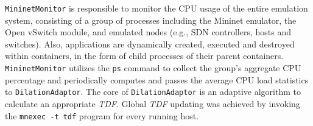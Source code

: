 \texttt{MininetMonitor} is responsible to monitor the CPU usage of the entire emulation system,
consisting of a group of processes including the Mininet emulator, the Open vSwitch module, and emulated nodes (e.g., SDN controllers, hosts and switches). 
Also, applications are dynamically created, executed and destroyed within containers, in the form of child processes of their parent containers. 
\texttt{MininetMonitor} utilizes the \texttt{ps} command to collect the group's aggregate CPU percentage
and periodically computes and passes the average CPU load statistics to \texttt{DilationAdaptor}. 
The core of \texttt{DilationAdaptor} is an adaptive algorithm to calculate an appropriate \textit{TDF}.
Global \textit{TDF} updating was achieved by invoking the \texttt{mnexec\ -t\ tdf} program for every running host. 




